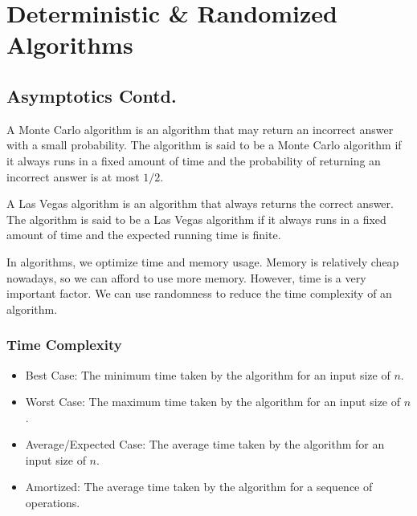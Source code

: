 \chapter{Deterministic \& Randomized Algorithms}

\section{Asymptotics Contd.}
\begin{definition}
    A Monte Carlo algorithm is an algorithm that may return an incorrect answer with a small probability. The algorithm is said to be a Monte Carlo algorithm if it always runs in a fixed amount of time and the probability of returning an incorrect answer is at most $1/2$.
\end{definition}

\begin{definition}
    A Las Vegas algorithm is an algorithm that always returns the correct answer. The algorithm is said to be a Las Vegas algorithm if it always runs in a fixed amount of time and the expected running time is finite.
\end{definition}

\begin{remark}
    In algorithms, we optimize time and memory usage. Memory is relatively cheap nowadays, so we can afford to use more memory. However, time is a very important factor. We can use randomness to reduce the time complexity of an algorithm.
\end{remark}
\subsection*{Time Complexity}
\begin{itemize}
    \item Best Case: The minimum time taken by the algorithm for an input size of $n$.
    \item Worst Case: The maximum time taken by the algorithm for an input size of $n$.
    \item Average/Expected Case: The average time taken by the algorithm for an input size of $n$.
    \item Amortized: The average time taken by the algorithm for a sequence of operations.
\end{itemize}

